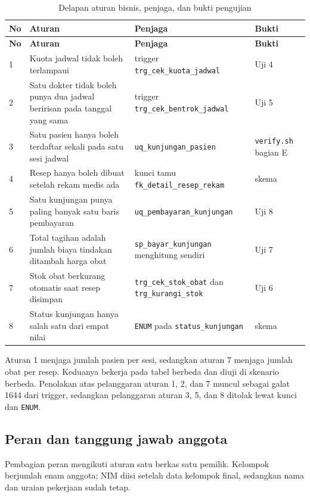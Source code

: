 \documentclass[12pt,a4paper]{article}
\begin{document}
\begin{longtable}{@{}p{0.7cm}p{6.1cm}p{4.4cm}p{3.2cm}@{}}
\caption{Delapan aturan bisnis, penjaga, dan bukti pengujian}
\label{tab:aturan}\\
\toprule
\textbf{No} & \textbf{Aturan} & \textbf{Penjaga} & \textbf{Bukti} \\
\midrule
\endfirsthead
\toprule
\textbf{No} & \textbf{Aturan} & \textbf{Penjaga} & \textbf{Bukti} \\
\midrule
\endhead
1 & Kuota jadwal tidak boleh terlampaui & trigger \texttt{trg\_cek\_kuota\_jadwal} & Uji 4 \\
2 & Satu dokter tidak boleh punya dua jadwal beririsan pada tanggal yang sama & trigger \texttt{trg\_cek\_bentrok\_jadwal} & Uji 5 \\
3 & Satu pasien hanya boleh terdaftar sekali pada satu sesi jadwal & \texttt{uq\_kunjungan\_pasien} & \texttt{verify.sh} bagian E \\
4 & Resep hanya boleh dibuat setelah rekam medis ada & kunci tamu \texttt{fk\_detail\_resep\_rekam} & skema \\
5 & Satu kunjungan punya paling banyak satu baris pembayaran & \texttt{uq\_pembayaran\_kunjungan} & Uji 8 \\
6 & Total tagihan adalah jumlah biaya tindakan ditambah harga obat & \texttt{sp\_bayar\_kunjungan} menghitung sendiri & Uji 7 \\
7 & Stok obat berkurang otomatis saat resep disimpan & \texttt{trg\_cek\_stok\_obat} dan \texttt{trg\_kurangi\_stok} & Uji 6 \\
8 & Status kunjungan hanya salah satu dari empat nilai & \texttt{ENUM} pada \texttt{status\_kunjungan} & skema \\
\bottomrule
\end{longtable}

Aturan 1 menjaga jumlah pasien per sesi, sedangkan aturan 7 menjaga jumlah obat
per resep. Keduanya bekerja pada tabel berbeda dan diuji di skenario berbeda.
Penolakan atas pelanggaran aturan 1, 2, dan 7 muncul sebagai galat 1644 dari
trigger, sedangkan pelanggaran aturan 3, 5, dan 8 ditolak lewat kunci dan
\texttt{ENUM}.

\subsection{Peran dan tanggung jawab anggota}

Pembagian peran mengikuti aturan satu berkas satu pemilik. Kelompok berjumlah
enam anggota; NIM diisi setelah data kelompok final, sedangkan nama dan uraian
pekerjaan sudah tetap.
\end{document}
